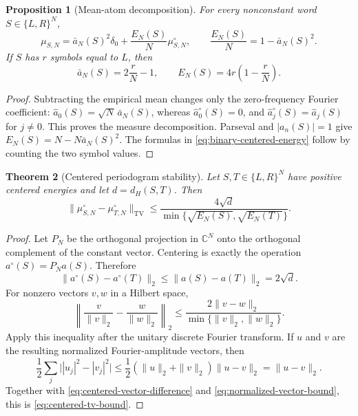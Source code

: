 \documentclass[11pt]{article}
\newtheorem{theorem}{Theorem}[section]
\newtheorem{proposition}[theorem]{Proposition}
\theoremstyle{definition}
\theoremstyle{remark}
\newcommand{\TV}{\mathrm{TV}}
\begin{document}
\begin{proposition}[Mean-atom decomposition]\label{prop:mean-atom-decomposition}
For every nonconstant word $S\in\{L,R\}^N$,
\begin{equation}\label{eq:mean-atom-decomposition}
    \mu_{S,N}
    =\bar a_N(S)^2\delta_0
     +\frac{E_N(S)}N\mu^{\circ}_{S,N},
    \qquad
    \frac{E_N(S)}N=1-\bar a_N(S)^2.
\end{equation}
If $S$ has $r$ symbols equal to $L$, then
\begin{equation}\label{eq:binary-centered-energy}
    \bar a_N(S)=2\frac rN-1,
    \qquad
    E_N(S)=4r\left(1-\frac rN\right).
\end{equation}
\end{proposition}

\begin{proof}
Subtracting the empirical mean changes only the zero-frequency Fourier coefficient: $\widehat a_0(S)=\sqrt N\,\bar a_N(S)$, whereas $\widehat a_0^{\circ}(S)=0$, and $\widehat a_j^{\circ}(S)=\widehat a_j(S)$ for $j\ne0$.  This proves the measure decomposition.  Parseval and $|a_n(S)|=1$ give $E_N(S)=N-N\bar a_N(S)^2$.  The formulas in \eqref{eq:binary-centered-energy} follow by counting the two symbol values.
\end{proof}

\begin{theorem}[Centered periodogram stability]\label{thm:centered-stability}
Let $S,T\in\{L,R\}^N$ have positive centered energies and let $d=d_H(S,T)$.  Then
\begin{equation}\label{eq:centered-tv-bound}
    \|\mu^{\circ}_{S,N}-\mu^{\circ}_{T,N}\|_{\TV}
    \le
    \frac{4\sqrt d}{\min\{\sqrt{E_N(S)},\sqrt{E_N(T)}\}}.
\end{equation}
\end{theorem}

\begin{proof}
Let $P_N$ be the orthogonal projection in $\mathbb C^N$ onto the orthogonal complement of the constant vector.  Centering is exactly the operation $a^{\circ}(S)=P_Na(S)$.  Therefore
\begin{equation}\label{eq:centered-vector-difference}
    \|a^{\circ}(S)-a^{\circ}(T)\|_2
    \le \|a(S)-a(T)\|_2
    =2\sqrt d.
\end{equation}
For nonzero vectors $v,w$ in a Hilbert space,
\begin{equation}\label{eq:normalized-vector-bound}
    \left\|\frac v{\|v\|_2}-\frac w{\|w\|_2}\right\|_2
    \le \frac{2\|v-w\|_2}{\min\{\|v\|_2,\|w\|_2\}}.
\end{equation}
Apply this inequality after the unitary discrete Fourier transform.  If $u$ and $v$ are the resulting normalized Fourier-amplitude vectors, then
\[
    \frac12\sum_j\bigl||u_j|^2-|v_j|^2\bigr|
    \le \frac12(\|u\|_2+\|v\|_2)\|u-v\|_2
    =\|u-v\|_2.
\]
Together with \eqref{eq:centered-vector-difference} and \eqref{eq:normalized-vector-bound}, this is \eqref{eq:centered-tv-bound}.
\end{proof}
\end{document}

